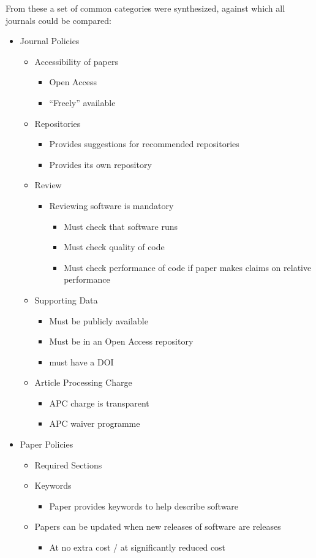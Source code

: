 \documentclass[11pt, oneside]{amsart}
\begin{document}
From these a set of common categories were synthesized, against which all journals could be compared:

\begin{itemize}
\item Journal Policies
\begin{itemize}
	\item Accessibility of papers
	\begin{itemize}
		\item Open Access
		\item ``Freely'' available
	\end{itemize}
	\item Repositories
	\begin{itemize}
		\item Provides suggestions for recommended repositories
		\item Provides its own repository
	\end{itemize}
	\item Review
	\begin{itemize}
		\item Reviewing software is mandatory
		\begin{itemize}
			\item Must check that software runs
			\item Must check quality of code
			\item Must check performance of code if paper makes claims on relative performance
		\end{itemize}
	\end{itemize}	
	\item Supporting Data
	\begin{itemize}
		\item Must be publicly available
		\item Must be in an Open Access repository
		\item must have a DOI
	\end{itemize}
	\item Article Processing Charge
	\begin{itemize}
		\item APC charge is transparent
		\item APC waiver programme
	\end{itemize}
\end{itemize}

\item Paper Policies
\begin{itemize}
	\item Required Sections
	\item Keywords
	\begin{itemize}
		\item Paper provides keywords to help describe software
	\end{itemize}
	\item Papers can be updated when new releases of software are releases
	\begin{itemize}
		\item At no extra cost / at significantly reduced cost
	\end{itemize}
\end{itemize}


\end{itemize}
\end{document}

